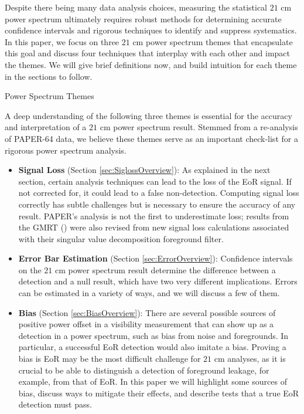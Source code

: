 \documentclass[preprint2,numberedappendix,tighten]{aastex6}  %
\begin{document}
Despite there being many data analysis choices, measuring the statistical $21$ cm power spectrum ultimately requires robust methods for determining accurate confidence intervals and rigorous techniques to identify and suppress systematics.  In this paper, we focus on three $21$ cm power spectrum themes that encapsulate this goal and discuss four techniques that interplay with each other and impact the themes. We will give brief definitions now, and build intuition for each theme in the sections to follow.

\begin{center}
Power Spectrum Themes
\end{center}

A deep understanding of the following three themes is essential for the accuracy and interpretation of a $21$ cm power spectrum result. Stemmed from a re-analysis of PAPER-64 data, we believe these themes serve as an important check-list for a rigorous power spectrum analysis.
\begin{itemize}
\item \textbf{Signal Loss} (Section \ref{sec:SiglossOverview}): As explained in the next section, certain analysis techniques can lead to the loss of the EoR signal. If not corrected for, it could lead to a false non-detection. Computing signal loss correctly has subtle challenges but is necessary to ensure the accuracy of any result. PAPER's analysis is not the first to underestimate loss; results from the GMRT (\citealt{paciga_et_al2013}) were also revised from new signal loss calculations associated with their singular value decomposition foreground filter.
\item \textbf{Error Bar Estimation} (Section \ref{sec:ErrorOverview}): Confidence intervals on the $21$ cm power spectrum result determine the difference between a detection and a null result, which have two very different implications. Errors can be estimated in a variety of ways, and we will discuss a few of them.
\item \textbf{Bias} (Section \ref{sec:BiasOverview}): There are several possible sources of positive power offset in a visibility measurement that can show up as a detection in a power spectrum, such as bias from noise and foregrounds. In particular, a successful EoR detection would also imitate a bias. Proving a bias is EoR may be the most difficult challenge for $21$ cm analyses, as it is crucial to be able to distinguish a detection of foreground leakage, for example, from that of EoR. In this paper we will highlight some sources of bias, discuss ways to mitigate their effects, and describe tests that a true EoR detection must pass.
\end{itemize}
\end{document}
